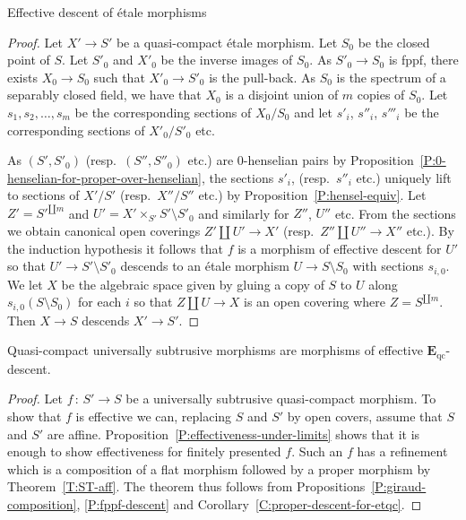 \documentclass[a4paper,twoside,11pt]{amsart}[2009/07/02] %
\newcommand{\pref}[1]{\eqref{#1}}
\newcommand{\map}[3]{#1\,:\, #2\rightarrow #3}
\newcommand{\etale}{\'{e}tale}
\newcommand{\catE}{\mathbf{E}}
\newcommand{\qc}{\mathrm{qc}}
\begin{document}
\begin{section}{Effective descent of \etale{} morphisms}
\begin{proof}
Let $X'\to S'$ be a quasi-compact \etale{} morphism. Let $S_0$
be the closed point of $S$. Let $S'_0$ and $X'_0$ be the inverse images of
$S_0$. As $S'_0\to S_0$ is fppf, there exists $X_0\to S_0$ such that $X'_0\to
S'_0$ is the pull-back. As $S_0$ is the spectrum of a separably closed field,
we have that $X_0$ is a disjoint union of $m$ copies of $S_0$. Let
$s_1,s_2,\dots,s_m$ be the corresponding sections of $X_0/S_0$ and let
$s'_i$, $s''_i$, $s'''_i$ be the corresponding sections of $X'_0/S'_0$ etc.

As $(S',S'_0)$ (resp.\ $(S'',S''_0)$ etc.) are $0$-henselian pairs by
Proposition~\pref{P:0-henselian-for-proper-over-henselian}, the sections
$s'_i$, (resp.\ $s''_i$ etc.) uniquely lift to sections of $X'/S'$ (resp.\ 
$X''/S''$ etc.) by Proposition~\pref{P:hensel-equiv}. Let $Z'=S'^{\amalg m}$ and
$U'=X'\times_{S'} S'\setminus S'_0$ and similarly for $Z''$, $U''$ etc. From
the sections we obtain canonical open coverings $Z'\amalg U'\to X'$ (resp.\ 
$Z''\amalg U''\to X''$ etc.). By the induction hypothesis it follows that $f$ is
a morphism of effective descent for $U'$ so that $U'\to S'\setminus S'_0$
descends to an \etale{} morphism $U\to S\setminus S_0$ with sections $s_{i,0}$.
We let $X$ be the algebraic space given by gluing a copy of $S$ to $U$ along
$s_{i,0}(S\setminus S_0)$ for each $i$ so that $Z\amalg U\to X$ is an open
covering where $Z=S^{\amalg m}$. Then $X\to S$ descends $X'\to S'$.
\end{proof}


\begin{theorem}\label{T:descent-for-etqc}
Quasi-compact universally subtrusive morphisms are morphisms of
effective $\catE_{\qc}$-descent.
\end{theorem}
\begin{proof}
Let $\map{f}{S'}{S}$ be a universally subtrusive quasi-compact morphism. To
show that $f$ is effective we can, replacing $S$ and $S'$ by open covers,
assume that $S$ and $S'$ are affine.
Proposition~\pref{P:effectiveness-under-limits} shows that it is enough to show
effectiveness for finitely presented $f$. Such an $f$ has a refinement which is
a composition of a flat morphism followed by a proper morphism by
Theorem~\pref{T:ST-aff}. The theorem thus follows from
Propositions~\pref{P:giraud-composition},
\pref{P:fppf-descent} and Corollary~\pref{C:proper-descent-for-etqc}.
\end{proof}


\end{section}
\end{document}
